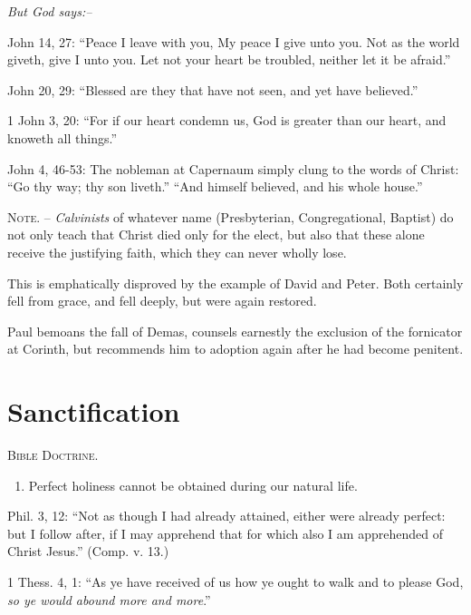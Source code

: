 \documentclass[
]{book}
\providecommand{\tightlist}{%
  \setlength{\itemsep}{0pt}\setlength{\parskip}{0pt}}
\begin{document}
\textsl{But God says:--}

John 14, 27: ``Peace I leave with you, My peace I give unto you. Not as the world giveth, give I unto you. Let not your heart be troubled, neither let it be afraid.''

John 20, 29: ``Blessed are they that have not seen, and yet have believed.''

1 John 3, 20: ``For if our heart condemn us, God is greater than our heart, and knoweth all things.''

John 4, 46-53: The nobleman at Capernaum simply clung to the words of Christ: ``Go thy way; thy son liveth.'' ``And himself believed, and his whole house.''

\textsc{Note.} -- \emph{Calvinists} of whatever name (Presbyterian, Congregational, Baptist) do not only teach that Christ died only for the elect, but also that these alone receive the justifying faith, which they can never wholly lose.

This is emphatically disproved by the example of David and Peter. Both certainly fell from grace, and fell deeply, but were again restored.

Paul bemoans the fall of Demas, counsels earnestly the exclusion of the fornicator at Corinth, but recommends him to adoption again after he had become penitent.

\hypertarget{sanctification}{%
\section*{\texorpdfstring{Sanctification}{Sanctification}}\label{sanctification}}

\begin{center}
\textsc{Bible Doctrine.}
\end{center}

\begin{enumerate}
\def\labelenumi{\alph{enumi}.}
\tightlist
\item
  Perfect holiness cannot be obtained during our natural life.
\end{enumerate}

Phil. 3, 12: ``Not as though I had already attained, either were already perfect: but I follow after, if I may apprehend that for which also I am apprehended of Christ Jesus.'' (Comp. v. 13.)

1 Thess. 4, 1: ``As ye have received of us how ye ought to walk and to please God, \emph{so ye would abound more and more}.''
\end{document}
